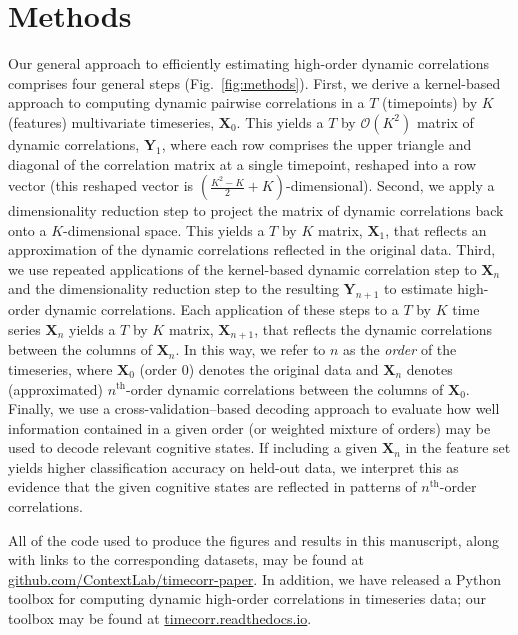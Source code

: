 \documentclass[english]{article}
\providecommand{\DIFaddbegin}{} %
\providecommand{\DIFaddend}{} %
\newcommand{\DIFaddincludegraphics}[2][]{{\color{blue}\fbox{\DIFOincludegraphics[#1]{#2}}}} %
\DeclareRobustCommand{\DIFaddbegin}{\DIFOaddbegin \let\includegraphics\DIFaddincludegraphics} %
\DeclareRobustCommand{\DIFaddend}{\DIFOaddend \let\includegraphics\DIFOincludegraphics} %
\begin{document}
\DIFaddend \section*{Methods}
Our general approach to efficiently estimating high-order dynamic
correlations comprises four general steps (Fig.~\ref{fig:methods}).
First, we derive a kernel-based approach to computing dynamic pairwise
correlations in a $T$ (timepoints) by $K$ (features) multivariate
timeseries, $\mathbf{X}_0$.  This yields a $T$ by $\mathcal{O}(K^2)$
matrix of dynamic correlations, $\mathbf{Y}_1$, where each row
comprises the upper triangle and diagonal of the correlation matrix at a single
timepoint, reshaped into a row vector (this reshaped vector is
$\left( \frac{K^2 - K}{2} + K \right)$-dimensional).  Second, we apply a dimensionality
reduction step to project the matrix of dynamic correlations back onto
a $K$-dimensional space.  This yields a $T$ by $K$ matrix,
$\mathbf{X}_1$, that reflects an approximation of the dynamic
correlations reflected in the original data.  Third, we use repeated
applications of the kernel-based dynamic correlation step to
$\mathbf{X}_n$ and the dimensionality reduction step to the resulting
$\mathbf{Y}_{n+1}$ to estimate high-order dynamic correlations.  Each
application of these steps to a $T$ by $K$ time series $\mathbf{X}_n$
yields a $T$ by $K$ matrix, $\mathbf{X}_{n+1}$, that reflects the
dynamic correlations between the columns of $\mathbf{X}_n$.  In this
way, we refer to $n$ as the \textit{order} of the timeseries, where
$\mathbf{X}_0$ (order 0) denotes the original data and $\mathbf{X}_n$
denotes (approximated) $n^\mathrm{th}$-order dynamic correlations
between the columns of $\mathbf{X}_0$.  Finally, we use a
cross-validation--based decoding approach to evaluate how well
information contained in a given order (or weighted mixture of orders)
may be used to decode relevant cognitive states.  If including a given
$\mathbf{X}_n$ in the feature set yields higher classification
accuracy on held-out data, we interpret this as evidence that the
given cognitive states are reflected in patterns of
$n^\mathrm{th}$-order correlations.
\DIFaddbegin 

\DIFaddend All of the code used to produce
the figures and results in this manuscript, along with links to the
corresponding datasets, may be found at
\href{https://github.com/ContextLab/timecorr-paper}{github.com/ContextLab/timecorr-paper}.
In addition, we have released a Python toolbox for computing dynamic
high-order correlations in timeseries data; our toolbox may be found
at
\href{https://timecorr.readthedocs.io/}{timecorr.readthedocs.io}.
\end{document}

